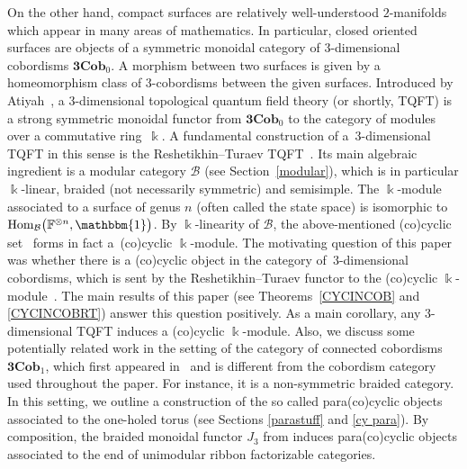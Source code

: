 \documentclass[10pt,a4paper]{amsart}
\numberwithin{equation}{section}
\newcommand{\tens}{\otimes}
\newcommand{\mc}{\mathcal}
\newcommand{\N}{\mathbb{N}}
\newcommand{\Hom}{\mathrm{Hom}}
\newcommand{\kk}{\Bbbk}
\newcommand{\uu}{\mathbbm{1}}
\newcommand{\coend}{\mathbb{F}}
\begin{document}
On the other hand, compact surfaces are relatively well-understood $2$-manifolds which appear in many areas of mathematics. In particular, closed oriented surfaces are objects of a symmetric monoidal category of $3$-dimensional cobordisms $\textbf{3Cob}_0$. A morphism between two surfaces is given by a homeomorphism class of $3$-cobordisms between the given surfaces. Introduced by Atiyah~\cite{At}, a $3$-dimensional topological quantum field theory (or shortly, TQFT) is a strong symmetric monoidal functor from $\textbf{3Cob}_0$ to the category of modules over a commutative ring~$\kk$.
 A fundamental construction of a~$3$-dimensional TQFT in this sense is the Reshetikhin--Turaev TQFT~\cite{reshetikhin_invariants_1991,turaevqinvariants}.
Its main algebraic ingredient is a modular category $\mc B$ (see Section~\ref{modular}), which is in particular $\kk$-linear, braided (not necessarily symmetric) and semisimple.
The $\kk$-module associated to a surface of genus $n$ (often called the state space) is isomorphic to~$\Hom_{\mc B}\bigl(\coend^{\tens n}, \uu\bigr)$.
By $\kk$-linearity of $\mc B$, the above-mentioned (co)cyclic set~\smash{$\bigl\{\Hom_{\mc B}\bigl(\coend^{\tens n+1}, \uu\bigr)\bigr\}_{n\in \N}$} forms in fact a~(co)cyclic $\kk$-module.
The motivating question of this paper was whether there is a (co)cyclic object in the category of~$3$-dimensional cobordisms, which is sent by the Reshetikhin--Turaev functor to the (co)cyclic $\kk$-module~\smash{$\bigl\{\Hom_{\mc B}\bigl(\coend^{\tens n+1}, \uu\bigr)\bigr\}_{n\in \N}$}.
The main results of this paper (see Theorems~\ref{CYCINCOB} and \ref{CYCINCOBRT}) answer this question positively.
As a main corollary, any $3$-dimensional TQFT induces a (co)cyclic $\kk$-module.
Also, we discuss some potentially related work in the setting of the category of connected cobordisms $\textbf{3Cob}_1$, which first appeared in~\cite{kerler} and is different from the cobordism category used throughout the paper. For instance, it is a non-symmetric braided category.
In this setting, we outline a construction of the so called para(co)cyclic objects associated to the one-holed torus (see Sections \ref{parastuff} and \ref{cy para}). By composition, the braided monoidal functor $J_3$ from \cite{beliakova-derenzi} induces para(co)cyclic objects associated to the end of unimodular ribbon factorizable categories.
\end{document}
